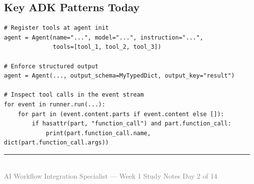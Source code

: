 \documentclass[12pt, a4paper]{article}
\begin{document}
\subsection*{Key ADK Patterns Today}

\begin{lstlisting}[style=pythonstyle]
# Register tools at agent init
agent = Agent(name="...", model="...", instruction="...",
              tools=[tool_1, tool_2, tool_3])

# Enforce structured output
agent = Agent(..., output_schema=MyTypedDict, output_key="result")

# Inspect tool calls in the event stream
for event in runner.run(...):
    for part in (event.content.parts if event.content else []):
        if hasattr(part, "function_call") and part.function_call:
            print(part.function_call.name, dict(part.function_call.args))
\end{lstlisting}

\vfill
\noindent\rule{\textwidth}{0.4pt}\\
{\small\textcolor{gray}{AI Workflow Integration Specialist --- Week 1 Study Notes \hfill Day 2 of 14}}
\end{document}
